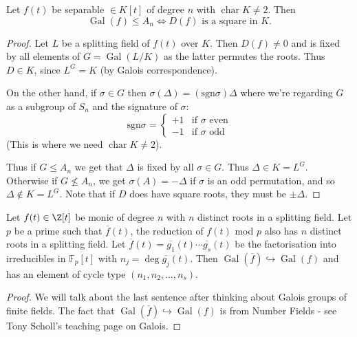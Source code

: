 \documentclass{article}
\DeclareMathOperator{\chara}{char}
\DeclareMathOperator{\Gal}{Gal}
\newcommand{\F}{\mathbb{F}}
\begin{document}
\begin{nlemma}\label{lem:3.11}
    Let $f(t)$ be separable $\in K[t]$ of degree $n$ with $\chara K \neq 2$.
    Then
    \begin{equation*}\Gal(f) \leq A_n \iff D(f)\text{ is a square in }K.\end{equation*}
\end{nlemma}
\begin{proof}
    Let $L$ be a splitting field of $f(t)$ over $K$.
    Then $D(f) \neq 0$ and is fixed by all elements of $G = \Gal(L/K)$ as the latter permutes the roots.
    Thus $D \in K$, since $L^G = K$ (by Galois correspondence).

    On the other hand, if $\sigma\in G$ then $\sigma(\Delta) = (\mathrm{sgn} \sigma) \Delta$ where we're regarding $G$ as a subgroup of $S_n$ and the signature of $\sigma$:
    \begin{equation*}
        \mathrm{sgn} \sigma =
        \begin{cases}
            +1 & \text{if $\sigma$ even} \\
            -1 & \text{if $\sigma$ odd}
        \end{cases}
    \end{equation*}
    (This is where we need $\chara K \neq 2$).

    Thus if $G \leq A_n$ we get that $\Delta$ is fixed by all $\sigma \in G$.
    Thus $\Delta \in K = L^G$.
    Otherwise if $G \nleq A_n$, we get $\sigma(A) = -\Delta$ if $\sigma$ is an odd permutation, and so $\Delta \notin K=L^G$.
    Note that if $D$ does have square roots, they must be $\pm \Delta$.
\end{proof}








\begin{nthm}\label{thm:3.13}
    Let $f(t) \in \Z[t]$ be monic of degree $n$ with $n$ distinct roots in a splitting field.
    Let $p$ be a prime such that $\overline{f}(t)$, the reduction of $f(t)$ mod $p$ also has $n$ distinct roots in a splitting field.
    Let $\overline{f}(t) = \overline{g_1}(t) \dotsm \overline{g_s}(t)$ be the factorisation into irreducibles in $\F_p[t]$ with $n_j = \deg \overline{g_j}(t)$.
    Then $\Gal(\overline{f}) \hookrightarrow \Gal(f)$ and has an element of cycle type $(n_1, n_2, \dotsc, n_s)$.
\end{nthm}
\begin{proof}
    We will talk about the last sentence after thinking about Galois groups of finite fields.
    The fact that $\Gal(\overline{f}) \hookrightarrow \Gal(f)$ is from Number Fields - see Tony Scholl's teaching page on Galois.
\end{proof}
\end{document}
